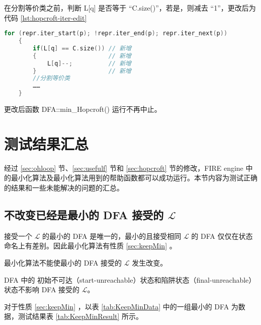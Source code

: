 在分割等价类之前，判断 L[q] 是否等于 “C.size()”，若是，则减去 “1”，更改后为代码 \ref{lst:hopcroft-iter-edit}

\lstset{style=mystyle}
\begin{lstlisting}[language=C++,label={lst:hopcroft-iter-edit},caption={ min-hop.cpp },firstnumber=100]
    for (repr.iter_start(p); !repr.iter_end(p); repr.iter_next(p))
    {
        if(L[q] == C.size()) // 新增
        {                    // 新增
            L[q]--;          // 新增
        }                    // 新增
        //分割等价类
        ……
    }
\end{lstlisting}

更改后函数 DFA::min\_Hopcroft() 运行不再中止。

\section{测试结果汇总}

经过 \ref{sec:ohloop} 节、\ref{sec:usefulf} 节和 \ref{sec:hopcroft} 节的修改，FIRE engine 中的最小化算法及最小化算法用到的帮助函数都可以成功运行。本节内容为测试正确的结果和一些未能解决的问题的汇总。

\subsection{不改变已经是最小的 DFA 接受的 $\mathcal{L}$}

接受一个 $\mathcal{L}$ 的最小的 DFA 是唯一的，最小的且接受相同 $\mathcal{L}$ 的 DFA 仅仅在状态命名上有差别\cite{book1}。因此最小化算法有性质 \ref{sec:keepMin} 。

\begin{property}\label{sec:keepMin}
    最小化算法不能使最小的 DFA 接受的 $\mathcal{L}$ 发生改变。
\end{property}

\begin{remark}
    DFA 中的 初始不可达（start-unreachable）状态和陷阱状态（final-unreachable）状态不影响 DFA 接受的 $\mathcal{L}$。
\end{remark}

对于性质 \ref{sec:keepMin} ，以表 \ref{tab:KeepMinData} 中的一组最小的 DFA 为数据，测试结果表 \ref{tab:KeepMinResult} 所示。




